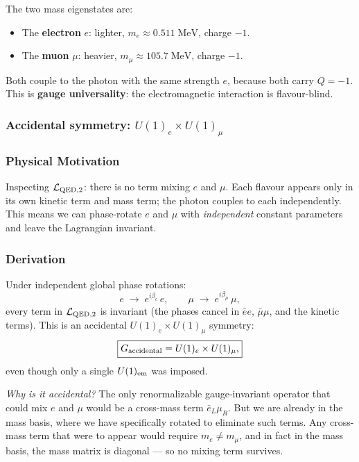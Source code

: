\documentclass[../main.tex]{subfiles}
\begin{document}
The two mass eigenstates are:
\begin{itemize}
  \item The \textbf{electron} $e$: lighter, $m_e\approx0.511\;\text{MeV}$, charge $-1$.
  \item The \textbf{muon} $\mu$: heavier, $m_\mu\approx105.7\;\text{MeV}$, charge $-1$.
\end{itemize}

Both couple to the photon with the same strength $e$, because both carry $Q=-1$.  This is \textbf{gauge universality}: the electromagnetic interaction is flavour-blind.

\subsubsection*{Accidental symmetry: $U(1)_e\times U(1)_\mu$}

\subsubsection*{Physical Motivation}

Inspecting $\mathcal{L}_{\mathrm{QED},2}$: there is no term mixing $e$ and $\mu$.  Each flavour appears only in its own kinetic term and mass term; the photon couples to each independently.  This means we can phase-rotate $e$ and $\mu$ with \emph{independent} constant parameters and leave the Lagrangian invariant.

\subsubsection*{Derivation}

Under independent global phase rotations:
\begin{equation}
  e \;\to\; e^{i\beta_e}\,e,
  \qquad
  \mu \;\to\; e^{i\beta_\mu}\,\mu,
  \label{eq:lec11:independent-rotations}
\end{equation}
every term in $\mathcal{L}_{\mathrm{QED},2}$ is invariant (the phases cancel in $\bar{e}e$, $\bar{\mu}\mu$, and the kinetic terms).  This is an accidental $U(1)_e\times U(1)_\mu$ symmetry:
\begin{equation}
  \boxed{
  G_{\rm accidental} = U(1)_e \times U(1)_\mu,}
  \label{eq:lec11:accidental}
\end{equation}
even though only a single $U(1)_{\rm em}$ was imposed.

\textit{Why is it accidental?}  The only renormalizable gauge-invariant operator that could mix $e$ and $\mu$ would be a cross-mass term $\bar{e}_L\mu_R$.  But we are already in the mass basis, where we have specifically rotated to eliminate such terms.  Any cross-mass term that were to appear would require $m_e\neq m_\mu$, and in fact in the mass basis, the mass matrix is diagonal — so no mixing term survives.
\end{document}
